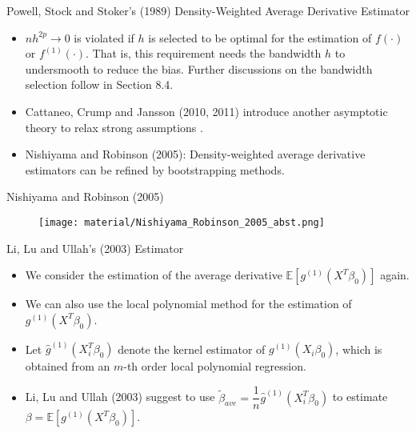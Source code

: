 \documentclass[xcolor=svgnames,dvipdfmx,cjk]{beamer}
\theoremstyle{example}
\def\E{\mathbb{E}}
\begin{document}
\begin{frame}{Powell, Stock and Stoker's (1989) Density-Weighted Average Derivative Estimator}
\begin{itemize}
  \item $nh^{2p} \to 0$ is violated if $h$ is selected to be optimal for the estimation of $f(\cdot)$ or $f^{(1)}(\cdot)$.
        That is, this requirement needs \alert{the bandwidth $h$ to undersmooth to reduce the bias}.
        Further discussions on the bandwidth selection follow in Section 8.4.
  \item Cattaneo, Crump and Jansson (2010, 2011) 
        introduce another asymptotic theory to relax strong assumptions .
  \item Nishiyama and Robinson (2005): Density-weighted average derivative estimators can be refined by bootstrapping methods.
\end{itemize}  
\end{frame}

\begin{frame}{Nishiyama and Robinson (2005)}
  \begin{figure}
    \begin{center}
    \texttt{[image: material/Nishiyama\_Robinson\_2005\_abst.png]}
    \end{center}
  \end{figure}
\end{frame}

\begin{frame}{Li, Lu and Ullah's (2003) Estimator}
\begin{itemize}
  \item We consider the estimation of the average derivative $\E[g^{(1)}(X^T\beta_0)]$ again.
  \item We can also use the local polynomial method for the estimation of $g^{(1)}(X^T\beta_0)$.
  \item Let $\hat{g}^{(1)}(X_i^T\beta_0)$ denote the kernel estimator of $g^{(1)}(X_i\beta_0)$,
        which is obtained from an $m$-th order local polynomial regression.
  \item Li, Lu and Ullah (2003) suggest to use $\tilde{\beta}_{ave} = \dfrac{1}{n}\hat{g}^{(1)}(X_i^T\beta_0)$ 
        to estimate $\beta = \E[{g}^{(1)}(X^T\beta_0)]$.
\end{itemize}
\end{frame}
\end{document}
